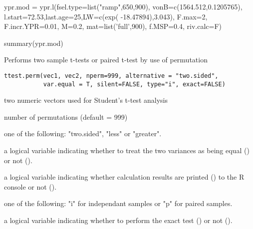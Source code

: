 \documentclass[a4paper]{book}
\begin{document}
%
\begin{Examples}
\begin{ExampleCode}
ypr.mod = ypr.l(fsel.type=list("ramp",650,900), vonB=c(1564.512,0.1205765), 
                l.start=72.53,last.age=25,LW=c(exp( -18.47894),3.043), F.max=2,
                F.incr.YPR=0.01, M=0.2, mat=list('full',900), f.MSP=0.4, riv.calc=F)  

summary(ypr.mod)
\end{ExampleCode}
\end{Examples}
\newpage
{}
%
\begin{Description}\relax
Performs two sample t-tests  or paired t-test by use of permutation
\end{Description}
%
\begin{Usage}
\begin{verbatim}
ttest.perm(vec1, vec2, nperm=999, alternative = "two.sided",
           var.equal = T, silent=FALSE, type="i", exact=FALSE)
\end{verbatim}
\end{Usage}
%
\begin{Arguments}
\begin{ldescription}
\item[\code{vec1, vec2 }] 
two numeric vectors used for Student's t-test analysis

\item[\code{nperm }] 
number of permutations (default = 999)

\item[\code{alternative }] 
one of the following: "two.sided", "less" or "greater".

\item[\code{var.equal }] 
a logical variable indicating whether to treat the two variances as being equal () or not ().

\item[\code{silent }] 
a logical variable indicating whether calculation results are printed () to the R console or not ().

\item[\code{type }] 
one of the following: "i" for independant samples or "p" for paired samples.

\item[\code{exact }] 
a logical variable indicating whether to perform the exact test () or not ().

\end{ldescription}
\end{Arguments}
\end{document}
